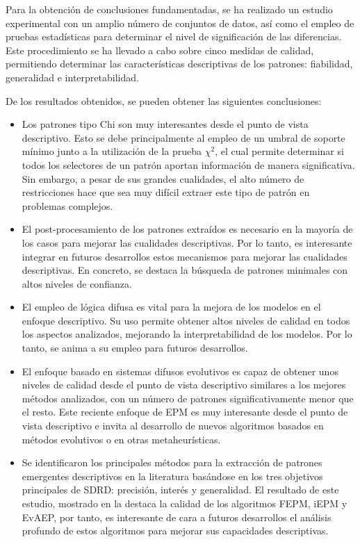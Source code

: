 \documentclass[c5paper,10pt,twoside]{book}	   	%
\begin{document}
Para la obtención de conclusiones fundamentadas, se ha realizado un estudio experimental con un amplio número de conjuntos de datos, así como el empleo de pruebas estadísticas para determinar el nivel de significación de las diferencias. Este procedimiento se ha llevado a cabo sobre cinco medidas de calidad, permitiendo determinar las características descriptivas de los patrones: fiabilidad, generalidad e interpretabilidad. 

De los resultados obtenidos, se pueden obtener las siguientes conclusiones:

\begin{itemize}
	\item Los patrones tipo Chi son muy interesantes desde el punto de vista descriptivo. Esto se debe principalmente al empleo de un umbral de soporte mínimo junto a la utilización de la prueba $\chi^2$, el cual permite determinar si todos los selectores de un patrón aportan información de manera significativa. Sin embargo, a pesar de sus grandes cualidades, el alto número de restricciones hace que sea muy difícil extraer este tipo de patrón en problemas complejos.
	
	\item El post-procesamiento de los patrones extraídos es necesario en la mayoría de los casos para mejorar las cualidades descriptivas. Por lo tanto, es interesante integrar en futuros desarrollos estos mecanismos para mejorar las cualidades descriptivas. En concreto, se destaca la búsqueda de patrones minimales con altos niveles de confianza. 
	
	\item El empleo de lógica difusa es vital para la mejora de los modelos en el enfoque descriptivo. Su uso permite obtener altos niveles de calidad en todos los aspectos analizados, mejorando la interpretabilidad de los modelos. Por lo tanto, se anima a su empleo para futuros desarrollos.
	
	\item  El enfoque basado en sistemas difusos evolutivos es capaz de obtener unos niveles de calidad desde el punto de vista descriptivo similares a los mejores métodos analizados, con un número de patrones significativamente menor que el resto. Este reciente enfoque de \ac{EPM} es muy interesante desde el punto de vista descriptivo e invita al desarrollo de nuevos algoritmos basados en métodos evolutivos o en otras metaheurísticas.
	
	\item Se identificaron los principales métodos para la extracción de patrones emergentes descriptivos en la literatura basándose en los tres objetivos principales de \ac{SDRD}: precisión, interés y generalidad. El resultado de este estudio, mostrado en la  destaca la calidad de los algoritmos FEPM, iEPM y EvAEP, por tanto, es interesante de cara a futuros desarrollos el análisis profundo de estos algoritmos para mejorar sus capacidades descriptivas.
	

\end{itemize}
\end{document}
